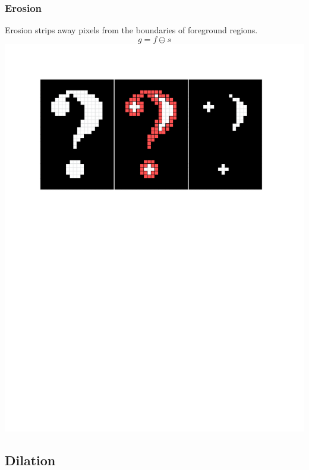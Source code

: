 \documentclass{beamer}
\begin{document}
\begin{frame}
\frametitle{Erosion}
\begin{center}
Erosion strips away pixels from the boundaries of foreground regions.
\begin{equation*}
g = f \ominus s
\end{equation*}
\includegraphics[width=1\textwidth,trim={0 0 0 0.5in},clip]{erosion}
\end{center}
\end{frame}

\subsection[Dilation]{Dilation}
\end{document}
